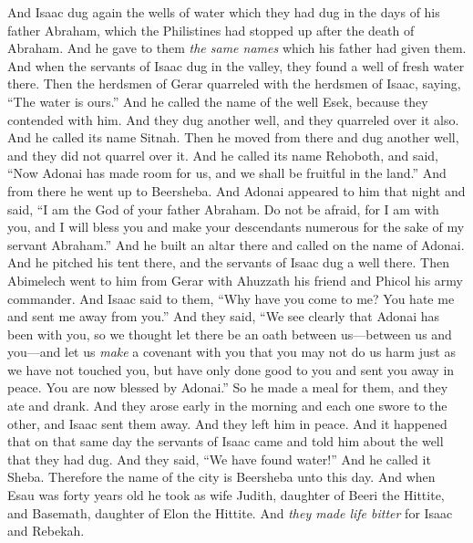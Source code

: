 \begin{biblechapter}
\verse And Isaac dug again the wells of water which they had dug in the days of his father Abraham, which the Philistines had stopped up after the death of Abraham. And he gave to them \textit{the same names} which his father had given them.
\verse And when the servants of Isaac dug in the valley, they found a well of fresh water there.
\verse Then the herdsmen of Gerar quarreled with the herdsmen of Isaac, saying, “The water is ours.” And he called the name of the well Esek, because they contended with him.
\verse And they dug another well, and they quarreled over it also. And he called its name Sitnah.
\verse Then he moved from there and dug another well, and they did not quarrel over it. And he called its name Rehoboth, and said, “Now Adonai has made room for us, and we shall be fruitful in the land.”
\verse And from there he went up to Beersheba.
\verse And Adonai appeared to him that night and said, “I am the God of your father Abraham. Do not be afraid, for I am with you, and I will bless you and make your descendants numerous for the sake of my servant Abraham.”
\verse And he built an altar there and called on the name of Adonai. And he pitched his tent there, and the servants of Isaac dug a well there.
\verse Then Abimelech went to him from Gerar with Ahuzzath his friend and Phicol his army commander.
\verse And Isaac said to them, “Why have you come to me? You hate me and sent me away from you.”
\verse And they said, “We see clearly that Adonai has been with you, so we thought let there be an oath between us—between us and you—and let us \textit{make} a covenant with you
\verse that you may not do us harm just as we have not touched you, but have only done good to you and sent you away in peace. You are now blessed by Adonai.”
\verse So he made a meal for them, and they ate and drank.
\verse And they arose early in the morning and each one swore to the other, and Isaac sent them away. And they left him in peace.
\verse And it happened that on that same day the servants of Isaac came and told him about the well that they had dug. And they said, “We have found water!”
\verse And he called it Sheba. Therefore the name of the city is Beersheba unto this day.
\verse And when Esau was forty years old he took as wife Judith, daughter of Beeri the Hittite, and Basemath, daughter of Elon the Hittite.
\verse And \textit{they made life bitter} for Isaac and Rebekah.
\end{biblechapter}

